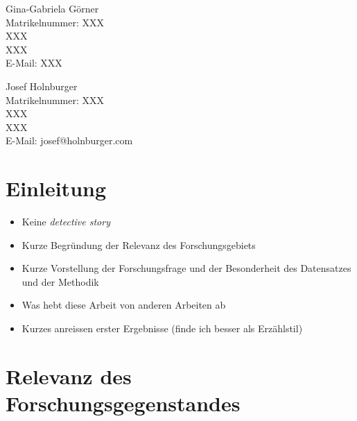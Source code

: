 \documentclass[12pt, 
    twoside=false, 
    bibliography=totoc, 
    numbers=endperiod, 
    headings=normal, 
    toc=chapterentrydotfill
    ]{scrbook}
\begin{document}
\begin{titlepage}
	\begin{minipage}[t]{0.48\textwidth}
    \flushleft 
    Gina-Gabriela Görner \\
    Matrikelnummer: XXX \\
    XXX \vspace{0.1cm} \\ 
	XXX \vspace{0.1cm}  \\
	E-Mail: XXX \\ 
    \end{minipage}
    \begin{minipage}[t]{0.48\textwidth}
	\flushleft
	Josef Holnburger \\
	Matrikelnummer: XXX \\
	XXX \vspace{0.1cm} \\
	XXX \vspace{0.1cm} \\
	E-Mail: josef@holnburger.com \\
    \end{minipage}

\end{titlepage}

\frontmatter

\tableofcontents

\mainmatter


\chapter{Einleitung}

\begin{itemize}
    \item Keine \emph{detective story}
    \item Kurze Begründung der Relevanz des Forschungsgebiets
    \item Kurze Vorstellung der Forschungsfrage und der Besonderheit des Datensatzes und der Methodik
    \item Was hebt diese Arbeit von anderen Arbeiten ab
    \item Kurzes anreissen erster Ergebnisse (finde ich besser als Erzählstil)
\end{itemize}

\chapter{Relevanz des Forschungsgegenstandes}
\end{document}
